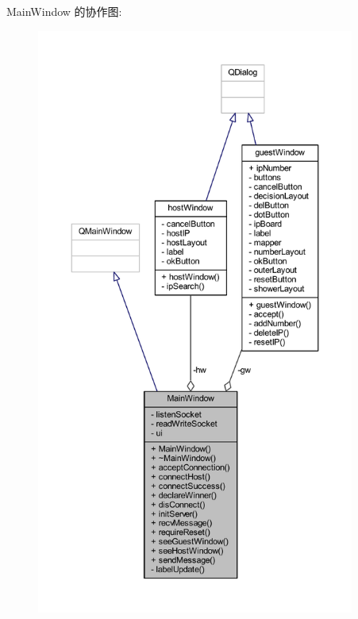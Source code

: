 Main\+Window 的协作图\+:
\nopagebreak
\begin{figure}[H]
\begin{center}
\leavevmode
\includegraphics[height=550pt]{d0/db8/class_main_window__coll__graph}
\end{center}
\end{figure}
